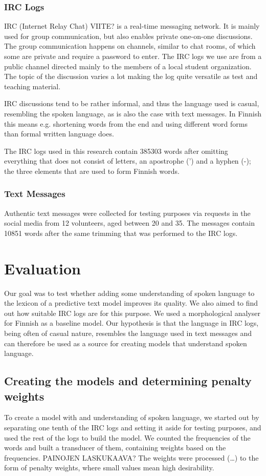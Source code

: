 \documentclass[a4paper,conference]{IEEEtran}
\begin{document}
\subsubsection{IRC Logs}
IRC (Internet Relay Chat) VIITE? is a real-time messaging network. It is mainly used for group communication, but also enables private one-on-one discussions. The group communication happens on channels, similar to chat rooms, of which some are private and require a password to enter. The IRC logs we use are from a public channel directed mainly to the members of a local student organization. The topic of the discussion varies a lot making the log quite versatile as test and teaching material.

IRC discussions tend to be rather informal, and thus the language used is casual, resembling the spoken language, as is also the case with text messages. In Finnish this  means e.g. shortening words from the end and using different word forms than formal written language does.

The IRC logs used in this research contain 385303 words after omitting everything that does not consist of letters, an apostrophe (') and a hyphen (-); the three elements that are used to form Finnish words.

\subsubsection{Text Messages}

Authentic text messages were collected for testing purposes via requests in the social media from 12 volunteers, aged between 20 and 35. The messages contain 10851 words after the same trimming that was performed to the IRC logs.

\section{Evaluation}
\label{sec:evaluation}

Our goal was to test whether adding some understanding of spoken language to the lexicon of a predictive text model improves its quality. We also aimed to find out how suitable IRC logs are for this purpose. We used a morphological analyser for Finnish as a baseline model. Our hypothesis is that the language in IRC logs, being often of casual nature, resembles the language used in text messages and can therefore be used as a source for creating models that understand spoken language.


\subsection{Creating the models and determining penalty weights}
\label{sec:weighting}
To create a model with and understanding of spoken language, we started out by separating one tenth of the IRC logs and setting it aside for testing purposes, and used the rest of the logs to build the model. We counted the frequencies of the words and built a transducer of them, containing weights based on the frequencies. PAINOJEN LASKUKAAVA? The weights were processed (…) to the form of penalty weights, where small values mean high desirability.
\end{document}
